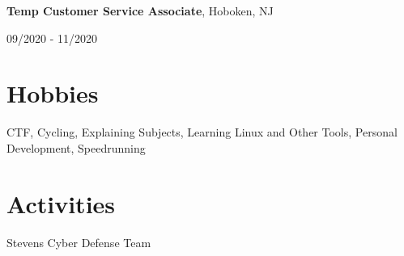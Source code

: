 \documentclass[11pt,letterpaper]{article}
\begin{document}
    \textbf{Temp Customer Service Associate}, Hoboken, NJ \hfill
    \begin{minipage}[t]{1.2in}
      09/2020 - 11/2020
    \end{minipage}
    
  \section{Hobbies}
    CTF, Cycling, Explaining Subjects, Learning Linux and Other Tools, Personal Development, Speedrunning
  
  \section{Activities}
    Stevens Cyber Defense Team

    
\end{document}
